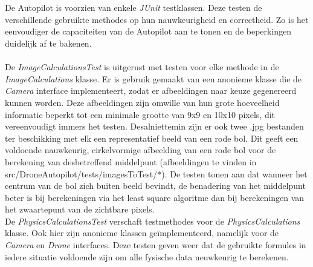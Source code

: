 \\
\\
De Autopilot is voorzien van enkele \textit{JUnit} testklassen. Deze testen de verschillende gebruikte methodes op hun nauwkeurigheid en correctheid. Zo is het eenvoudiger de capaciteiten van de Autopilot aan te tonen en de beperkingen duidelijk af te bakenen.
\\
\\
De \textit{ImageCalculationsTest} is uitgerust met testen voor elke methode in de \textit{ImageCalculations} klasse. Er is gebruik gemaakt van een anonieme klasse die de \textit{Camera} interface implementeert, zodat er afbeeldingen naar keuze gegenereerd kunnen worden. Deze afbeeldingen zijn omwille van hun grote hoeveelheid informatie beperkt tot een minimale grootte van 9x9 en 10x10 pixels, dit vereenvoudigt immers het testen. Desalniettemin zijn er ook twee .jpg bestanden ter beschikking met elk een representatief beeld van een rode bol. Dit geeft een voldoende nauwkeurig, cirkelvormige afbeelding van een rode bol voor de berekening van desbetreffend middelpunt (afbeeldingen te vinden in src/DroneAutopilot/tests/imagesToTest/*). De testen tonen aan dat wanneer het centrum van de bol zich buiten beeld bevindt, de benadering van het middelpunt beter is bij berekeningen via het least square algoritme dan bij berekeningen van het zwaartepunt van de zichtbare pixels.%
\\
De \textit{PhysicsCalculationsTest} verschaft testmethodes voor de \textit{PhysicsCalculations} klasse. Ook hier zijn anonieme klassen ge\"implementeerd, namelijk voor de \textit{Camera} en \textit{Drone} interfaces. Deze testen geven weer dat de gebruikte formules in iedere situatie voldoende zijn om alle fysische data neuwkeurig te berekenen.


